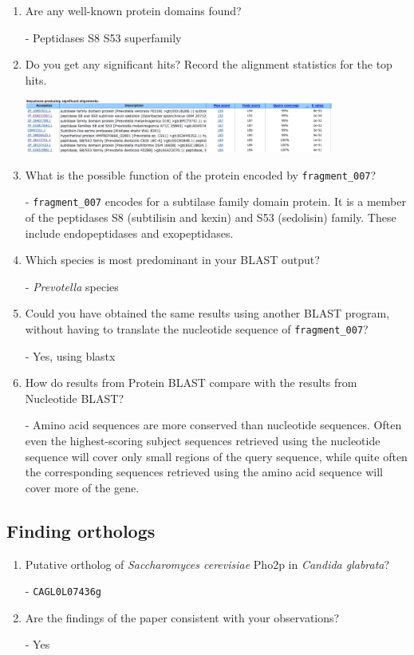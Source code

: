 \documentclass[a4paper,11pt]{article}
\begin{document}
\begin{enumerate}
\item Are any well-known protein domains found? 

- Peptidases S8 S53 superfamily

\item Do you get any significant hits? Record the alignment statistics for the top hits. 

\vspace{0.5cm}
\begin{center}
\includegraphics[width=0.8\textwidth]{blastp.png}
\end{center}
\vspace{0.5cm}

\item What is the possible function of the protein encoded by \texttt{fragment\_007}?

- \texttt{fragment\_007} encodes for a subtilase family domain protein. It is a member of the peptidases S8 (subtilisin and kexin) and S53 (sedolisin) family. These include endopeptidases and exopeptidases.

\item Which species is most predominant in your BLAST output?

- \emph{Prevotella} species

\item Could you have obtained the same results using another BLAST program, without having to translate the nucleotide sequence of \texttt{fragment\_007}?

- Yes, using blastx

\item How do results from Protein BLAST compare with the results from Nucleotide BLAST?

- Amino acid sequences are more conserved than nucleotide sequences. Often even the highest-scoring subject sequences retrieved using the nucleotide sequence will cover only small regions of the query sequence, while quite often the corresponding sequences retrieved using the amino acid sequence will cover more of the gene.

\end{enumerate}

\subsection{Finding orthologs}
\begin{enumerate}
\item Putative ortholog of \emph{Saccharomyces cerevisiae} Pho2p in \emph{Candida glabrata}?

- \texttt{CAGL0L07436g}

\item Are the findings of the paper consistent with your observations?

- Yes
\end{enumerate}
\end{document}
